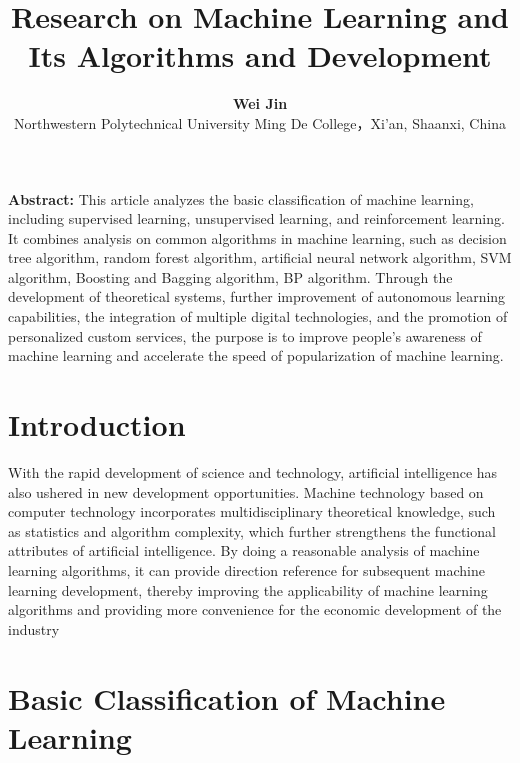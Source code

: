 \documentclass{article}
\title{
\textbf{Research on Machine Learning and Its Algorithms and Development}
}
\author{
\textbf{Wei Jin}\\
Northwestern Polytechnical University Ming De College，Xi’an, Shaanxi, China
}
\begin{document}
\maketitle

\textbf{Abstract:}
 This article analyzes the basic classification of machine learning, including 
supervised learning, unsupervised learning, and reinforcement learning. It combines analysis 
on common algorithms in machine learning, such as decision tree algorithm, random forest 
algorithm, artificial neural network algorithm, SVM algorithm, Boosting and Bagging 
algorithm, BP algorithm. Through the development of theoretical systems, further 
improvement of autonomous learning capabilities, the integration of multiple digital 
technologies, and the promotion of personalized custom services, the purpose is to improve 
people's awareness of machine learning and accelerate the speed of popularization of machine 
learning.

\section{ Introduction}
With the rapid development of science and technology, artificial intelligence has also ushered in new 
development opportunities. Machine technology based on computer technology incorporates 
multidisciplinary theoretical knowledge, such as statistics and algorithm complexity, which further 
strengthens the functional attributes of artificial intelligence. By doing a reasonable analysis of 
machine learning algorithms, it can provide direction reference for subsequent machine learning 
development, thereby improving the applicability of machine learning algorithms and providing more 
convenience for the economic development of the industry

\section{Basic Classification of Machine Learning}
\end{document}
